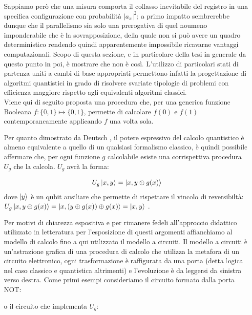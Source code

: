 \documentclass[12pt,a4paper,openright]{report}
\newcommand*\xor{\mathbin{\oplus}}
\begin{document}
Sappiamo però che una misura comporta il collasso inevitabile del registro in una specifica configurazione con probabilità ${\left\vert{a_x}\right\vert}^2$; a primo impatto sembrerebbe dunque che il parallelismo
sia solo una prerogativa di quel noumeno imponderabile che è la sovrapposizione, della quale non si può avere un quadro deterministico rendendo quindi apparentemente impossibile ricavarne vantaggi computazionali.
Scopo di questa sezione, e in particolare della tesi in generale da questo punto in poi, è mostrare che non è così. L'utilizzo di particolari stati di partenza uniti a cambi di base appropriati permettono infatti
la progettazione di algoritmi quantistici in grado di risolvere svariate tipologie di problemi con efficienza maggiore rispetto agli equivalenti algoritmi classici.\\
Viene qui di seguito proposta una procedura che, per una generica funzione Booleana $f:\{0,1\} \mapsto \{0,1\}$, permette di calcolare $f(0)$ e $f(1)$ contemporaneamente applicando $f$ una volta sola.\par
Per quanto dimostrato da Deutsch \cite{ref12}, il potere espressivo del calcolo quantistico è almeno equivalente a quello di un qualsiasi formalismo classico, è quindi possibile affermare che, per ogni funzione
$g$ calcolabile esiste una corrispettiva procedura $U_g$ che la calcola. $U_g$ avrà la forma:

\[
    U_g\ket{x,y} = \ket{x, y\xor g(x)}
\]
dove $\ket{y}$ è un qubit ausiliare che permette di rispettare il vincolo di reversibiltà: $U_g\ket{x, y \xor g(x)} = \ket{x, (y\xor g(x)) \xor g(x)} = \ket{x, y}$ .

Per motivi di chiarezza espositiva e per rimanere fedeli all'approccio didattico utilizzato in letteratura per l'esposizione di questi argomenti affianchiamo al modello di calcolo fino a qui utilizzato il modello
a circuiti. Il modello a circuiti è un'astrazione grafica di una procedura di calcolo che utilizza la metafora di un circuito elettronico, ogni trasformazione è raffigurata da una porta 
(detta logica nel caso classico e quantistica altrimenti) e l'evoluzione è da leggersi da sinistra verso destra. Come primi esempi consideriamo il circuito formato dalla porta NOT:

\begin{figure}[h] 
    \centering
\end{figure}
o il circuito che implementa $U_g$:
\end{document}
